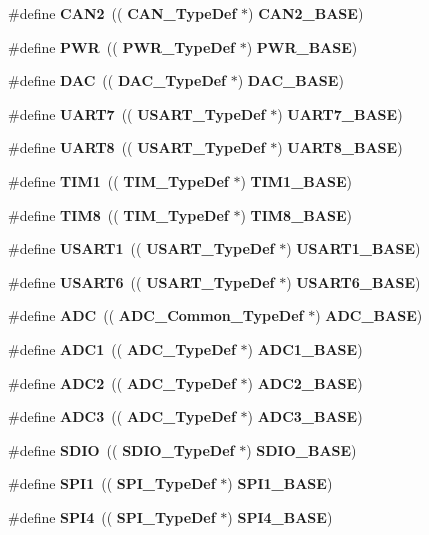 \begin{DoxyCompactItemize}
\item 
\#define \textbf{ C\+A\+N2}~((\textbf{ C\+A\+N\+\_\+\+Type\+Def} $\ast$) \textbf{ C\+A\+N2\+\_\+\+B\+A\+SE})
\item 
\#define \textbf{ P\+WR}~((\textbf{ P\+W\+R\+\_\+\+Type\+Def} $\ast$) \textbf{ P\+W\+R\+\_\+\+B\+A\+SE})
\item 
\#define \textbf{ D\+AC}~((\textbf{ D\+A\+C\+\_\+\+Type\+Def} $\ast$) \textbf{ D\+A\+C\+\_\+\+B\+A\+SE})
\item 
\#define \textbf{ U\+A\+R\+T7}~((\textbf{ U\+S\+A\+R\+T\+\_\+\+Type\+Def} $\ast$) \textbf{ U\+A\+R\+T7\+\_\+\+B\+A\+SE})
\item 
\#define \textbf{ U\+A\+R\+T8}~((\textbf{ U\+S\+A\+R\+T\+\_\+\+Type\+Def} $\ast$) \textbf{ U\+A\+R\+T8\+\_\+\+B\+A\+SE})
\item 
\#define \textbf{ T\+I\+M1}~((\textbf{ T\+I\+M\+\_\+\+Type\+Def} $\ast$) \textbf{ T\+I\+M1\+\_\+\+B\+A\+SE})
\item 
\#define \textbf{ T\+I\+M8}~((\textbf{ T\+I\+M\+\_\+\+Type\+Def} $\ast$) \textbf{ T\+I\+M8\+\_\+\+B\+A\+SE})
\item 
\#define \textbf{ U\+S\+A\+R\+T1}~((\textbf{ U\+S\+A\+R\+T\+\_\+\+Type\+Def} $\ast$) \textbf{ U\+S\+A\+R\+T1\+\_\+\+B\+A\+SE})
\item 
\#define \textbf{ U\+S\+A\+R\+T6}~((\textbf{ U\+S\+A\+R\+T\+\_\+\+Type\+Def} $\ast$) \textbf{ U\+S\+A\+R\+T6\+\_\+\+B\+A\+SE})
\item 
\#define \textbf{ A\+DC}~((\textbf{ A\+D\+C\+\_\+\+Common\+\_\+\+Type\+Def} $\ast$) \textbf{ A\+D\+C\+\_\+\+B\+A\+SE})
\item 
\#define \textbf{ A\+D\+C1}~((\textbf{ A\+D\+C\+\_\+\+Type\+Def} $\ast$) \textbf{ A\+D\+C1\+\_\+\+B\+A\+SE})
\item 
\#define \textbf{ A\+D\+C2}~((\textbf{ A\+D\+C\+\_\+\+Type\+Def} $\ast$) \textbf{ A\+D\+C2\+\_\+\+B\+A\+SE})
\item 
\#define \textbf{ A\+D\+C3}~((\textbf{ A\+D\+C\+\_\+\+Type\+Def} $\ast$) \textbf{ A\+D\+C3\+\_\+\+B\+A\+SE})
\item 
\#define \textbf{ S\+D\+IO}~((\textbf{ S\+D\+I\+O\+\_\+\+Type\+Def} $\ast$) \textbf{ S\+D\+I\+O\+\_\+\+B\+A\+SE})
\item 
\#define \textbf{ S\+P\+I1}~((\textbf{ S\+P\+I\+\_\+\+Type\+Def} $\ast$) \textbf{ S\+P\+I1\+\_\+\+B\+A\+SE})
\item 
\#define \textbf{ S\+P\+I4}~((\textbf{ S\+P\+I\+\_\+\+Type\+Def} $\ast$) \textbf{ S\+P\+I4\+\_\+\+B\+A\+SE})
\item 

\end{DoxyCompactItemize}
